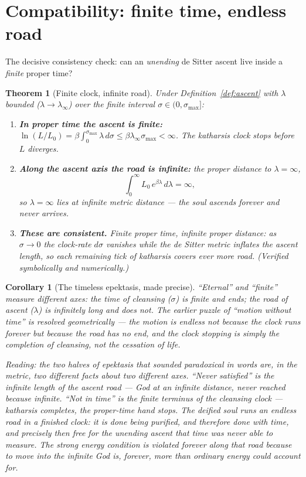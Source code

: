 \documentclass[11pt,a4paper]{article}
\newcommand{\note}[1]{\textcolor{black!65}{\emph{#1}}}
\theoremstyle{plain}
\newtheorem{corollary}{Corollary}
\newtheorem{theorem}{Theorem}
\theoremstyle{definition}
\theoremstyle{remark}
\begin{document}
\section{Compatibility: finite time, endless road}

The decisive consistency check: can an \emph{unending} de Sitter ascent live inside a \emph{finite}
proper time?

\begin{theorem}[Finite clock, infinite road]\label{thm:compat}
Under Definition~\ref{def:ascent} with $\lambda$ bounded ($\lambda\to\lambda_\infty$) over the finite
interval $\sigma\in(0,\sigma_{\max}]$:
\begin{enumerate}[label=(\roman*),leftmargin=1.8em,itemsep=2pt]
\item \textbf{In proper time the ascent is finite:}
$\ln(L/L_0)=\beta\!\int_0^{\sigma_{\max}}\!\lambda\,d\sigma\le\beta\lambda_\infty\sigma_{\max}<\infty$.
The katharsis clock stops before $L$ diverges.
\item \textbf{Along the ascent axis the road is infinite:} the proper distance to $\lambda=\infty$,
\begin{equation}
\int_0^\infty L_0\,e^{\beta\lambda}\,d\lambda=\infty,
\end{equation}
so $\lambda=\infty$ lies at infinite metric distance --- the soul ascends forever and never arrives.
\item \textbf{These are consistent.} Finite proper time, infinite proper distance: as $\sigma\to0$ the
clock-rate $d\sigma$ vanishes while the de Sitter metric inflates the ascent length, so each remaining
tick of katharsis covers ever more road. (Verified symbolically and numerically.)
\end{enumerate}
\end{theorem}

\begin{corollary}[The timeless epektasis, made precise]
``Eternal'' and ``finite'' measure different axes: the time of cleansing ($\sigma$) is finite and
ends; the road of ascent ($\lambda$) is infinitely long and does not. The earlier puzzle of
``motion without time'' is resolved geometrically --- the motion is endless not because the clock runs
forever but because the road has no end, and the clock stopping is simply the completion of cleansing,
not the cessation of life.
\end{corollary}

\note{Reading: the two halves of epektasis that sounded paradoxical in words are, in the metric, two
different facts about two different axes. ``Never satisfied'' is the infinite length of the ascent
road --- God at an infinite distance, never reached because infinite. ``Not in time'' is the finite
terminus of the cleansing clock --- katharsis completes, the proper-time hand stops. The deified soul
runs an endless road in a finished clock: it is done being purified, and therefore done with time, and
precisely then free for the unending ascent that time was never able to measure. The strong energy
condition is violated forever along that road because to move into the infinite God is, forever, more
than ordinary energy could account for.}
\end{document}
